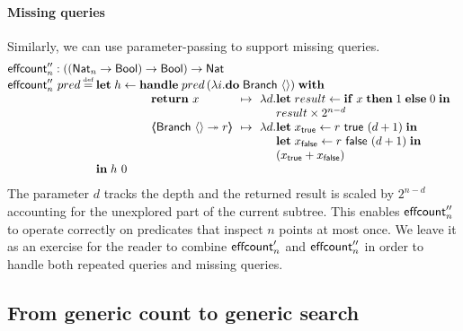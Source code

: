 \documentclass[12pt,phd,lfcs,twoside,openright,logo,leftchapter,normalheadings]{infthesis}
\theoremstyle{plain}
\theoremstyle{definition}
\begin{document}
\paragraph{Missing queries}
%
Similarly, we can use parameter-passing to support missing queries.
%
{
\[
  \bl
    \ECount''_n : ((\Nat_n \to \Bool) \to \Bool) \to \Nat\\
    \ECount''_n~pred \defas
      \bl
      \Let\;h \revto \bl
                     \Handle\;pred\,(\lambda i. \Do\;\Branch~\Unit)\;\With\\
                     \quad
                       \ba[t]{@{}l@{\hspace{1.5ex}}c@{\hspace{1.5ex}}l@{}}
                         \Return~x &\mapsto& \lambda d.
                           \ba[t]{@{}l}
                             \Let\; result \revto \If\;x\;\Then\;1\;\Else\;0\;\In\;\\
                             result \times 2^{n - d}\\
                           \ea\\
                         \OpCase{\Branch}{\Unit}{r} &\mapsto& \lambda d.
                           \ba[t]{@{}l}
                             \Let\;x_\True \revto r~\True~(d+1)\;\In\\
                             \Let\;x_\False \revto r~\False~(d+1)\;\In\\
                             (x_\True + x_\False)
                           \ea
                       \ea\\
                     \el \\
      \In\;h~0 \\
      \el \\
  \el
\]}%
%
The parameter $d$ tracks the depth and the returned result is scaled
by $2^{n-d}$ accounting for the unexplored part of the current
subtree.
%
This enables $\mathsf{effcount}''_n$ to operate correctly on predicates that
inspect $n$ points at most once.
%
We leave it as an exercise for the reader to combine $\mathsf{effcount}'_n$ and
$\mathsf{effcount}''_n$ in order to handle both repeated queries and missing
queries.

\subsection{From generic count to generic search}
\label{sec:count-vs-search}
\end{document}
